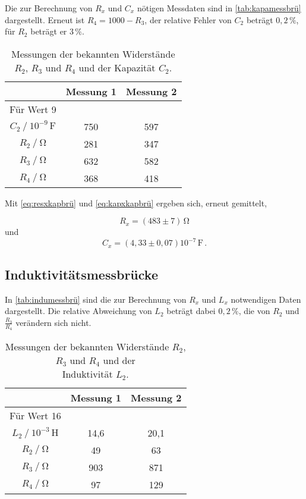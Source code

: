 Die zur Berechnung von $R_x$ und $C_x$ nötigen Messdaten sind in \autoref{tab:kapamessbrü}
dargestellt. Erneut ist $R_4 = 1000 - R_3$, der relative Fehler von $C_2$ beträgt $0,2 \,\%$, für $R_2$
beträgt er $3 \,\%$.

\begin{table}[H]
  \centering
  \caption{Messungen der bekannten Widerstände $R_2$, $R_3$ und $R_4$ und der Kapazität $C_2$.}
  \label{tab:kapamessbrü}
  \begin{tabular}{S S S}
    \toprule
    & {Messung 1} & {Messung 2} \\
    \midrule
    {Für Wert 9} \\
    {$C_2 \mathbin{/} 10^{-9} \,\unit{\farad}$} &  750 & 597\\
                {$R_2 \mathbin{/} \unit{\ohm}$} &  281 & 347 \\
                {$R_3 \mathbin{/} \unit{\ohm}$} &  632 & 582 \\
                {$R_4 \mathbin{/} \unit{\ohm}$} &  368 & 418 \\
  \end{tabular}
\end{table}

Mit \eqref{eq:resxkapbrü} und \eqref{eq:kapxkapbrü} ergeben sich, erneut gemittelt,

\begin{equation*}
  R_x = (483 \pm 7) \,\unit{\ohm}
\end{equation*}
und
\begin{equation*}
  C_x = (4,33 \pm 0,07)10^{-7} \,\unit{\farad} \,.
\end{equation*}


\subsection{Induktivitätsmessbrücke}

In \autoref{tab:indumessbrü} sind die zur Berechnung von $R_x$ und $L_x$ notwendigen Daten dargestellt.
Die relative Abweichung von $L_2$ beträgt dabei $0,2 \,\%$, die von $R_2$ und $\frac{R_3}{R_4}$ verändern
sich nicht.

\begin{table}[H]
  \centering
  \caption{Messungen der bekannten Widerstände $R_2$, $R_3$ und $R_4$ und der \\ Induktivität $L_2$.}
  \label{tab:indumessbrü}
  \begin{tabular}{S S[table-format=3.1] S[table-format=3.1]}
    \toprule
    & {Messung 1} & {Messung 2} \\
    \midrule
    {Für Wert 16} \\
    {$L_2 \mathbin{/} 10^{-3} \,\unit{\henry}$} &   14,6  &    20,1   \\
                {$R_2 \mathbin{/} \unit{\ohm}$} &   49    &    63     \\
                {$R_3 \mathbin{/} \unit{\ohm}$} &  903    &   871     \\
                {$R_4 \mathbin{/} \unit{\ohm}$} &   97    &   129     \\
  \end{tabular}
\end{table}

